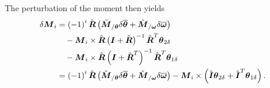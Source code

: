\documentclass[10pt,dvips,fleqn]{report}
\newcommand{\T}[1]{\boldsymbol{#1}}
\begin{document}
The perturbation of the moment then yields
\begin{align}
	\delta\T{M}_i
	&= \plbr{-1}^i \hat{\T{R}} \plbr{
		\tilde{\T{M}}_{/\T{\theta}} \delta\overline{\T{\theta}}
		+ \tilde{\T{M}}_{/\T{\omega}} \delta\overline{\T{\omega}}
	} \nonumber \\
	& \mbox{\hspace{10pt}} - \T{M}_i \times \hat{\T{R}}
		\plbr{\T{I} + \tilde{\T{R}}}^{-1} \hat{\T{R}}^T \T{\theta}_{2\delta}
	\nonumber \\
	& \mbox{\hspace{10pt}} - \T{M}_i \times \hat{\T{R}} 
		\plbr{\T{I} + \tilde{\T{R}}^T}^{-1} \hat{\T{R}}^T \T{\theta}_{1\delta} \\
	&= \plbr{-1}^i \hat{\T{R}} \plbr{
		\tilde{\T{M}}_{/\T{\theta}} \delta\overline{\T{\theta}}
		+ \tilde{\T{M}}_{/\T{\omega}} \delta\overline{\T{\omega}}
	} - \T{M}_i \times \plbr{
		\hat{\T{I}} \T{\theta}_{2\delta}
		+ \hat{\T{I}}^T \T{\theta}_{1\delta}
	} .
\end{align}
\end{document}

